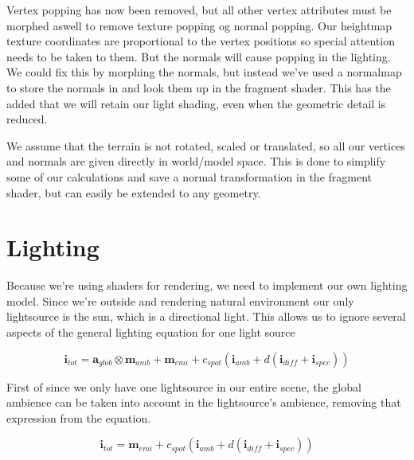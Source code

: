 

Vertex popping has now been removed, but all other vertex attributes
must be morphed aswell to remove texture popping og normal
popping. Our heightmap texture coordinates are proportional to the
vertex positions so special attention needs to be taken to them. But
the normals will cause popping in the lighting. We could fix this by
morphing the normals, but instead we've used a normalmap to store the
normals in and look them up in the fragment shader. This has the added
that we will retain our light shading, even when the geometric detail is
reduced.

We assume that the terrain is not rotated, scaled or translated, so
all our vertices and normals are given directly in world/model
space. This is done to simplify some of our calculations and save a
normal transformation in the fragment shader, but can easily be
extended to any geometry.

\section{Lighting}


Because we're using shaders for rendering, we need to implement our
own lighting model. Since we're outside and rendering natural
environment our only lightsource is the sun, which is a directional
light. This allows us to ignore several aspects of the general
lighting equation for one light source


\begin{displaymath}
  \mathbf{i}_{tot} = \mathbf{a}_{glob} \otimes \mathbf{m}_{amb} +
  \mathbf{m}_{emi} + c_{spot}(\mathbf{i}_{amb} + d(\mathbf{i}_{diff} + \mathbf{i}_{spec}))
\end{displaymath}

First of since we only have one lightsource in our entire
scene, the global ambience can be taken into account in the
lightsource's ambience, removing that expression from the
equation.

\begin{displaymath}
  \mathbf{i}_{tot} = \mathbf{m}_{emi} + c_{spot}(\mathbf{i}_{amb} + d(\mathbf{i}_{diff} + \mathbf{i}_{spec}))
\end{displaymath}


